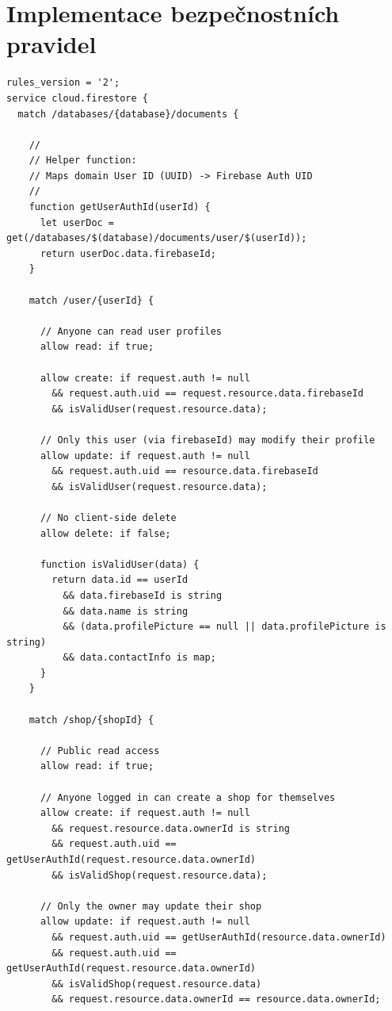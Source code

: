 \section{Implementace bezpečnostních pravidel}

\begin{lstlisting}[language=FirestoreRules, caption={Ukázka pravidel pro Firestore}, label={lst:firestore-rules}]
rules_version = '2';
service cloud.firestore {
  match /databases/{database}/documents {

    //
    // Helper function:
    // Maps domain User ID (UUID) -> Firebase Auth UID
    //
    function getUserAuthId(userId) {
      let userDoc = get(/databases/$(database)/documents/user/$(userId));
      return userDoc.data.firebaseId;
    }

    match /user/{userId} {

      // Anyone can read user profiles
      allow read: if true;

      allow create: if request.auth != null
        && request.auth.uid == request.resource.data.firebaseId
        && isValidUser(request.resource.data);

      // Only this user (via firebaseId) may modify their profile
      allow update: if request.auth != null
        && request.auth.uid == resource.data.firebaseId
        && isValidUser(request.resource.data);

      // No client-side delete
      allow delete: if false;

      function isValidUser(data) {
        return data.id == userId
          && data.firebaseId is string
          && data.name is string
          && (data.profilePicture == null || data.profilePicture is string)
          && data.contactInfo is map;
      }
    }

    match /shop/{shopId} {

      // Public read access
      allow read: if true;

      // Anyone logged in can create a shop for themselves
      allow create: if request.auth != null
        && request.resource.data.ownerId is string
        && request.auth.uid == getUserAuthId(request.resource.data.ownerId)
        && isValidShop(request.resource.data);

      // Only the owner may update their shop
      allow update: if request.auth != null
        && request.auth.uid == getUserAuthId(resource.data.ownerId)
        && request.auth.uid == getUserAuthId(request.resource.data.ownerId)
        && isValidShop(request.resource.data)
        && request.resource.data.ownerId == resource.data.ownerId;



\end{lstlisting}
